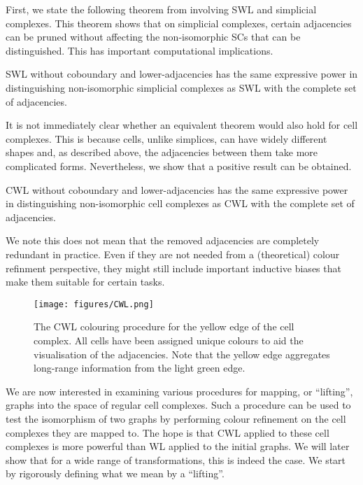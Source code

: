 \documentclass{article}
\begin{document}
First, we state the following theorem from \citet{bodnar2021weisfeiler} involving SWL and simplicial complexes. This theorem shows that on simplicial complexes, certain adjacencies can be pruned without affecting the non-isomorphic SCs that can be distinguished. This has important computational implications. 

\begin{theorem}
SWL without coboundary and lower-adjacencies has the same expressive power in distinguishing non-isomorphic simplicial complexes as SWL with the complete set of adjacencies. 
\end{theorem}

It is not immediately clear whether an equivalent theorem would also hold for cell complexes. This is because cells, unlike simplices, can have widely different shapes and, as described above, the adjacencies between them take more complicated forms. Nevertheless, we show that a positive result can be obtained. 

\begin{theorem}
\label{thm:sparse_cwl}
CWL without coboundary and lower-adjacencies has the same expressive power in distinguishing non-isomorphic cell complexes as CWL with the complete set of adjacencies. 
\end{theorem}

We note this does not mean that the removed adjacencies are completely redundant in practice. Even if they are not needed from a (theoretical) colour refinment perspective, they might still include important inductive biases that make them suitable for certain tasks. 

\begin{figure}
    \centering
    \texttt{[image: figures/CWL.png]}
    \caption{The CWL colouring procedure for the yellow edge of the cell complex. All cells have been assigned unique colours to aid the visualisation of the adjacencies. Note that the yellow edge aggregates long-range information from the light green edge.}
    \label{fig:CWL}
\end{figure}

We are now interested in examining various procedures for mapping, or ``lifting'', graphs into the space of regular cell complexes. Such a procedure can be used to test the isomorphism of two graphs by performing colour refinement on the cell complexes they are mapped to. The hope is that CWL applied to these cell complexes is more powerful than WL applied to the initial graphs. We will later show that for a wide range of transformations, this is indeed the case. We start by rigorously defining what we mean by a  ``lifting''.
\end{document}
